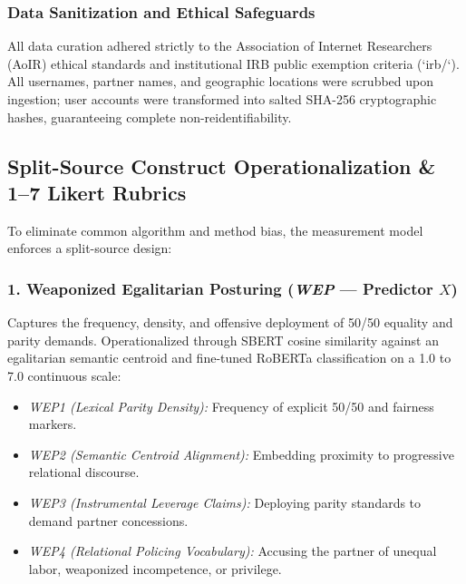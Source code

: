 \subsubsection{Data Sanitization and Ethical Safeguards}
All data curation adhered strictly to the Association of Internet Researchers (AoIR) ethical standards and institutional IRB public exemption criteria (`irb/`). All usernames, partner names, and geographic locations were scrubbed upon ingestion; user accounts were transformed into salted SHA-256 cryptographic hashes, guaranteeing complete non-reidentifiability.

\subsection{Split-Source Construct Operationalization \& 1--7 Likert Rubrics}
To eliminate common algorithm and method bias, the measurement model enforces a split-source design:

\subsubsection{1. Weaponized Egalitarian Posturing (\textit{WEP} --- Predictor $X$)}
Captures the frequency, density, and offensive deployment of 50/50 equality and parity demands. Operationalized through SBERT cosine similarity against an egalitarian semantic centroid and fine-tuned RoBERTa classification on a 1.0 to 7.0 continuous scale:
\begin{itemize}[leftmargin=*]
    \item \textit{WEP1 (Lexical Parity Density):} Frequency of explicit 50/50 and fairness markers.
    \item \textit{WEP2 (Semantic Centroid Alignment):} Embedding proximity to progressive relational discourse.
    \item \textit{WEP3 (Instrumental Leverage Claims):} Deploying parity standards to demand partner concessions.
    \item \textit{WEP4 (Relational Policing Vocabulary):} Accusing the partner of unequal labor, weaponized incompetence, or privilege.
\end{itemize}

